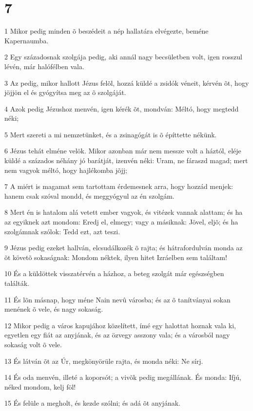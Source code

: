 \chapter{7}

\par 1 Mikor pedig minden õ beszédeit a nép hallatára elvégezte, beméne Kapernaumba.
\par 2 Egy századosnak szolgája pedig, aki annál nagy becsületben volt, igen rosszul lévén, már halófélben vala.
\par 3 Az pedig, mikor hallott Jézus felõl, hozzá küldé a zsidók véneit, kérvén õt, hogy jöjjön el és gyógyítsa meg az õ szolgáját.
\par 4 Azok pedig Jézushoz menvén, igen kérék õt, mondván: Méltó, hogy megtedd néki;
\par 5 Mert szereti a mi nemzetünket, és a zsinagógát is õ építtette nékünk.
\par 6 Jézus tehát elméne velök. Mikor azonban már nem messze volt a háztól, eléje küldé a százados néhány jó barátját, izenvén néki: Uram, ne fáraszd magad; mert nem vagyok méltó, hogy hajlékomba jõjj;
\par 7 A miért is magamat sem tartottam érdemesnek arra, hogy hozzád menjek: hanem csak szóval mondd, és meggyógyul az én szolgám.
\par 8 Mert én is hatalom alá vetett ember vagyok, és vitézek vannak alattam; és ha az egyiknek azt mondom: Eredj el, elmegy; vagy a másiknak: Jövel, eljõ; és ha szolgámnak szólok: Tedd ezt, azt teszi.
\par 9 Jézus pedig ezeket hallván, elcsudálkozék õ rajta; és hátrafordulván monda az õt követõ sokaságnak: Mondom néktek, ilyen hitet Izráelben sem találtam!
\par 10 És a küldöttek visszatérvén a házhoz, a beteg szolgát már egészségben találták.
\par 11 És lõn másnap, hogy méne Nain nevû városba; és az õ tanítványai sokan menének õ vele, és nagy sokaság.
\par 12 Mikor pedig a város kapujához közelített, ímé egy halottat hoznak vala ki, egyetlen egy fiát az anyjának, és az özvegy asszony vala; és a városból nagy sokaság volt õ vele.
\par 13 És látván õt az Úr, megkönyörüle rajta, és monda néki: Ne sírj.
\par 14 És oda menvén, illeté a koporsót; a vivõk pedig megállának. És monda: Ifjú, néked mondom, kelj föl!
\par 15 És felüle a megholt, és kezde szólni; és adá õt anyjának.
